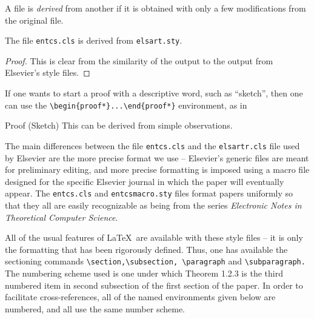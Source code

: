 \documentclass{entcs} \usepackage{entcsmacro}
\begin{document}
\begin{definition}
  A file is \emph{derived} from another if it is obtained with only a
  few modifications from the original file.
\end{definition}

\begin{theorem}
  The file \texttt{\normalshape entcs.cls} is derived from
  \texttt{\normalshape elsart.sty}.
\end{theorem}
\begin{proof}
  This is clear from the similarity of the output to the output from
  Elsevier's style files.
\end{proof}

If one wants to start a proof with a descriptive word, such as
``sketch'', then one can use the \verb+\begin{proof*}...\end{proof*}+
environment, as in

\begin{proof*}{Proof (Sketch)}
  This can be derived from simple observations.
\end{proof*}

The main differences between the file \texttt{entcs.cls} and the
\texttt{elsartr.cls} file used by Elsevier are the more precise format
we use -- Elsevier's generic files are meant for preliminary editing,
and more precise formatting is imposed using a macro file designed for
the specific Elsevier journal in which the paper will eventually
appear. The \texttt{entcs.cls} and \texttt{entcsmacro.sty} files
format papers uniformly so that they all are easily recognizable as
being from the series \emph{Electronic Notes in Theoretical Computer
  Science}.

All of the usual features of \LaTeX\ are available with these
style files -- it is only the formatting that has been rigorously
defined. Thus, one has available the sectioning commands
\verb+\section,\subsection, \paragraph+ and \verb+\subparagraph.+
The numbering scheme used is one under which Theorem 1.2.3 is the
third numbered item in second subsection of the first section of
the paper.  In order to facilitate cross-references, all of the
named environments given below are numbered, and all use the same
number scheme.
\end{document}
